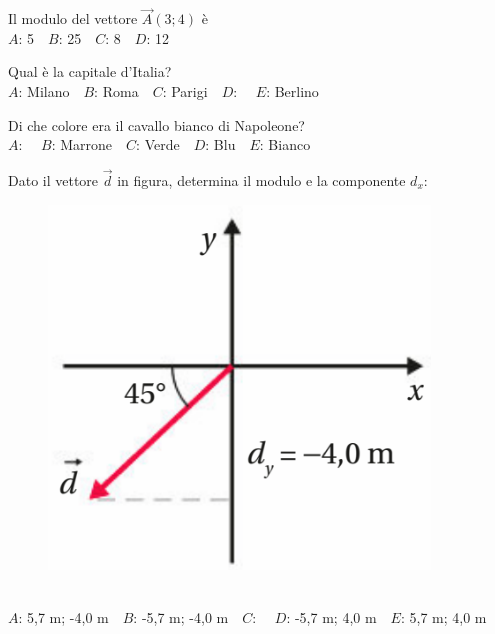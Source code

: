 \mcquestionfooter



\def\mcquestionnumber{10}


\mcquestionheader Il modulo del vettore $\vec{A}(3;4)$ è\\
{$A$}: 5\ \ {$B$}: 25\ \ {$C$}: 8\ \ {$D$}: 12\ \ 

\mcquestionfooter



\def\mcquestionnumber{11}


\mcquestionheader Qual è la capitale d’Italia?\\
{$A$}: Milano\ \ {$B$}: Roma\ \ {$C$}: Parigi\ \ {$D$}: \ \ {$E$}: Berlino\ \ 

\mcquestionfooter



\def\mcquestionnumber{12}


\mcquestionheader Di che colore era il cavallo bianco di Napoleone?\\
{$A$}: \ \ {$B$}: Marrone\ \ {$C$}: Verde\ \ {$D$}: Blu\ \ {$E$}: Bianco\ \ 

\mcquestionfooter



\mcpaperfooter

\def\mcserialnumber{39}
\mcpaperheader


\def\mcquestionnumber{1}


\mcquestionheader Dato il vettore $\vec{d}$ in figura, determina il modulo e la componente $d_x$: \begin{figure}[h!]   \begin{center}     \includegraphics[scale=0.35]{vettored.png}   \end{center} \end{figure}\\
{$A$}: 5,7 m; -4,0 m\ \ {$B$}: -5,7 m; -4,0 m\ \ {$C$}: \ \ {$D$}: -5,7 m; 4,0 m\ \ {$E$}: 5,7 m; 4,0 m\ \ 

